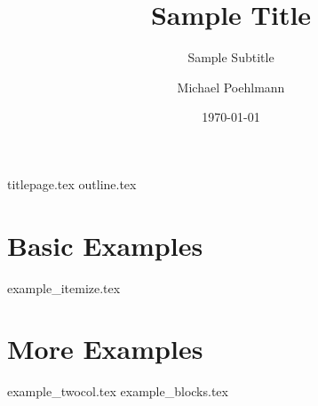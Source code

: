 \documentclass[aspectratio=1610, t]{beamer}  %
\title{Sample Title}
\subtitle{Sample Subtitle}
\author[M. Poehlmann]{Michael Poehlmann}
\institute{UC Davis}
\date{\today}
\begin{document}
{titlepage.tex}
{outline.tex}

\section{Basic Examples}
{example_itemize.tex}

\section{More Examples}
{example_twocol.tex}
{example_blocks.tex}
\end{document}
